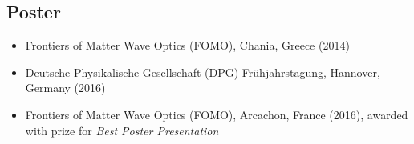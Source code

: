 \begin{refsection}
    \subsection*{Poster}
    \begin{itemize}
        \item Frontiers of Matter Wave Optics (FOMO), Chania, Greece (2014)
        \item Deutsche Physikalische Gesellschaft (DPG) Frühjahrstagung, Hannover, Germany (2016)
        \item Frontiers of Matter Wave Optics (FOMO), Arcachon, France (2016), awarded with prize for \emph{Best Poster Presentation}
    \end{itemize}

\end{refsection}